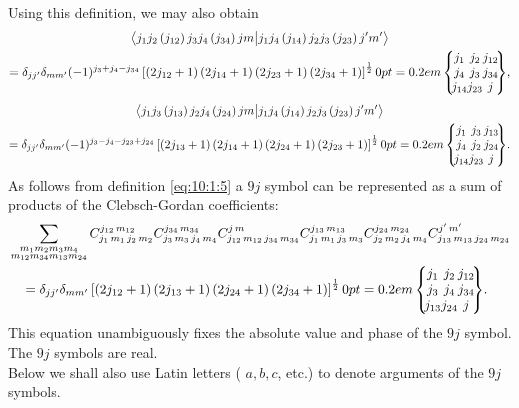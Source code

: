 Using this definition, we may also obtain
\begin{multline}
\braket{ j_{1} j_{2}\left(j_{12}\right) j_{3} j_{4}\left(j_{34}\right) j m }{ j_{1} j_{4}\left(j_{14}\right) j_{2} j_{3}\left(j_{23}\right) j^{\prime} m^{\prime}} \\
=\delta_{j j^{\prime}} \delta_{m m^{\prime}}(-1)^{j_{3}+j_{4}-j_{34}}\left[\left(2 j_{12}+1\right)\left(2 j_{14}+1\right)\left(2 j_{23}+1\right)\left(2 j_{34}+1\right)\right]^{\frac{1}{2}}\ninej{j_{1}}{j_{2}}{j_{12}}{j_{4}}{j_{3}}{j_{34}}{j_{14}}{j_{23}}{j},  \label{eq:10:1:6}
\end{multline}
\begin{multline}
\braket{ j_{1} j_{3}\left(j_{13}\right) j_{2} j_{4}\left(j_{24}\right) j m }{ j_{1} j_{4}\left(j_{14}\right) j_{2} j_{3}\left(j_{23}\right) j^{\prime} m^{\prime}}  \\
=\delta_{j j^{\prime}} \delta_{m m^{\prime}}(-1)^{j_{3}-j_{4}-j_{23}+j_{24}}\left[\left(2 j_{13}+1\right)\left(2 j_{14}+1\right)\left(2 j_{24}+1\right)\left(2 j_{23}+1\right)\right]^{\frac{1}{2}}\ninej{j_{1}}{j_{3}}{j_{13}}{j_{4}}{j_{2}}{j_{24}}{j_{14}}{j_{23}}{j} . \label{eq:10:1:7}
\end{multline}
As follows from definition \eqref{eq:10:1:5} a $9 j$ symbol can be represented as a sum of products of the Clebsch-Gordan coefficients:
\begin{align}
& \sum_{\substack{m_{1} m_{2} m_{3} m_{4} \\ m_{12} m_{34} m_{13} m_{24}}} \clebsch{j_{1}}{m_{1}}{j_{2}}{m_{2}}{j_{12}}{m_{12}} \clebsch{j_{3}}{m_{3}}{j_{4}}{m_{4}}{j_{34}}{m_{34}} \clebsch{j_{12}}{m_{12}}{j_{34}}{m_{34}}{j}{m} \clebsch{j_{1}}{m_{1}}{j_{3}}{m_{3}}{j_{13}}{m_{13}} \clebsch{j_{2}}{m_{2}}{j_{4}}{m_{4}}{j_{24}}{m_{24}} \clebsch{j_{13}}{m_{13}}{j_{24}}{m_{24}}{j^{\prime}}{m^{\prime}}  \notag\\
& \quad=\delta_{j j^{\prime}} \delta_{m m^{\prime}}\left[\left(2 j_{12}+1\right)\left(2 j_{13}+1\right)\left(2 j_{24}+1\right)\left(2 j_{34}+1\right)\right]^{\frac{1}{2}}\ninej{j_{1}}{j_{2}}{j_{12}}{j_{3}}{j_{4}}{j_{34}}{j_{13}}{j_{24}}{j}. \label{eq:10:1:8}
\end{align}
This equation unambiguously fixes the absolute value and phase of the $9 j$ symbol. The $9 j$ symbols are real.\\
Below we shall also use Latin letters ( $a, b, c$, etc.) to denote arguments of the $9 j$ symbols.\\
